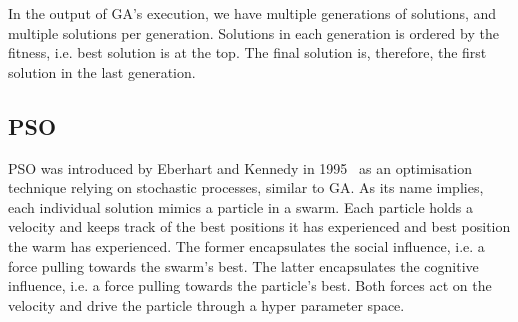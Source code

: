 \documentclass[graybox]{svmult}
\begin{document}
In the output of GA's execution, we have multiple generations of solutions, and multiple solutions per generation. Solutions in each generation is ordered by the fitness, i.e. best solution is at the top. The final solution is, therefore, the first solution in the last generation.

\subsection{PSO}

PSO was introduced by Eberhart and Kennedy in 1995 \cite{eberhart1995new} \ as an optimisation technique relying on stochastic processes, similar to GA. As its name implies, each individual solution mimics a particle in a swarm. Each particle holds a velocity and keeps track of the best positions it has experienced and best position the warm has experienced. The former encapsulates the social influence, i.e. a force pulling towards the swarm's best. The latter encapsulates the cognitive influence, i.e. a force pulling towards the particle's best. Both forces act on the velocity and drive the particle through a hyper parameter space.
\end{document}
